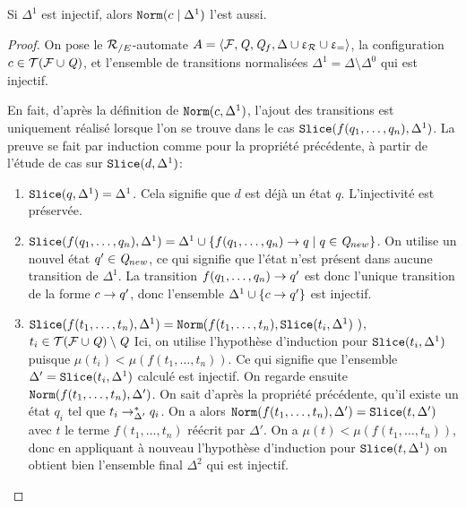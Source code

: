  \begin{property}
   \label{prop:norm_injectivity}
   Si $\Delta^1$ est injectif, alors $\mathtt{Norm}(c \; | \; \Delta^1)$ l'est aussi.
 \end{property}

 \begin{proof}
   On pose le ${\mathcal R_{/E}}$-automate $A = \langle \mathcal{F}, \mathit Q, \mathit Q_f, \Delta \cup \upvarepsilon_{\mathcal R} \cup \upvarepsilon_{=}\rangle$,
   la configuration $c \in \mathcal{ T(F \cup \mathit Q)}$, et l'ensemble de transitions normalisées $\Delta^1 = \Delta \setminus \Delta^0$ qui est injectif.
   
   En fait, d'après la définition de $\mathtt{Norm}(c, \Delta^1)$, l'ajout des transitions est 
   uniquement réalisé lorsque l'on se trouve dans le cas $\mathtt{Slice}(f(q_1,\dots,q_n), \Delta^1)$.
   La preuve se fait par induction comme pour la propriété précédente, à partir de l'étude de cas sur $\mathtt{Slice}(d, \Delta^1)$:

   \begin{enumerate}
   \item $\mathtt{Slice}(q, \Delta^1) = \Delta^1$. Cela signifie que $d$ est déjà un état $q$. L'injectivité est préservée.
     
   \item $\mathtt{Slice}(f(q_1, \dots, q_n), \Delta^1) = \Delta^1 \cup \{ f(q_1, \dots, q_n) \rightarrow q \; | \; q \in \mathit Q_{new}\}$. 
     On utilise un nouvel état $q' \in \mathit Q_{new}$, ce qui signifie que l'état n'est présent dans aucune transition
     de $\Delta^1$. La transition $f(q_1, \dots, q_n) \rightarrow q'$ est donc l'unique transition de la forme $c \rightarrow q'$,
     donc l'ensemble $\Delta^1 \cup \{ c \rightarrow q'\}$ est injectif.

   \item $\mathtt{Slice}(f(t_1, \dots, t_n), \Delta^1) = \mathtt{Norm}(f(t_1,\dots, t_n), \mathtt{Slice}(t_i, \Delta^1)\ )$, $t_i \in \mathcal{ T(F \cup \mathit Q)} \setminus \mathit Q$
     Ici, on utilise l'hypothèse d'induction pour $\mathtt{Slice}(t_i, \Delta^1)$ puisque $\mu (t_i) < \mu(f(t_1, \dots, t_n))$.
     Ce qui signifie que l'ensemble $\Delta' = \mathtt{Slice}(t_i, \Delta^1)$ calculé est injectif.
     On regarde ensuite $\mathtt{Norm}(f(t_1,\dots, t_n), \Delta')$. On sait d'après la propriété précédente, qu'il existe
     un état $q_i$ tel que $t_i \rightarrow^*_{\Delta'} q_i$. On a alors $\mathtt{Norm}(f(t_1,\dots, t_n), \Delta') = \mathtt{Slice}(t, \Delta')$
     avec $t$ le terme $f(t_1,\dots, t_n)$ réécrit par $\Delta'$. On a $\mu (t) < \mu(f(t_1, \dots, t_n))$, donc en
     appliquant à nouveau l'hypothèse d'induction pour $\mathtt{Slice}(t, \Delta^1)$ on obtient bien l'ensemble final $\Delta^2$ qui est injectif.
   \end{enumerate}

\end{proof}

